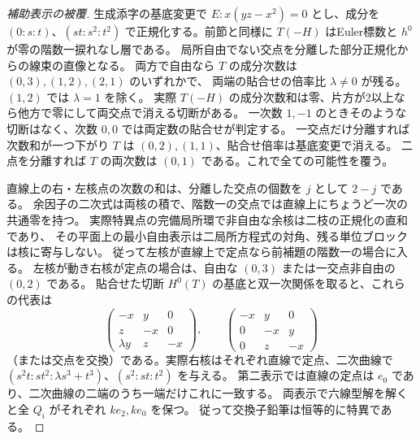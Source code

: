 \begin{proof}[補助表示の被覆]
生成添字の基底変更で $E:x(yz-x^2)=0$ とし、成分を
$(0:s:t)$、$(st:s^2:t^2)$ で正規化する。前節と同様に
$T(-H)$ はEuler標数と $h^0$ が零の階数一捩れなし層である。
局所自由でない交点を分離した部分正規化からの線束の直像となる。
両方で自由なら $T$ の成分次数は $(0,3),(1,2),(2,1)$ のいずれかで、
両端の貼合せの倍率比 $\lambda\ne0$ が残る。$(1,2)$ では $\lambda=1$ を除く。
実際 $T(-H)$ の成分次数和は零、片方が2以上なら他方で零にして両交点で消える切断がある。
一次数 $1,-1$ のときそのような切断はなく、次数 $0,0$ では両定数の貼合せが判定する。
一交点だけ分離すれば次数和が一つ下がり $T$ は $(0,2),(1,1)$、貼合せ倍率は基底変更で消える。
二点を分離すれば $T$ の両次数は $(0,1)$ である。これで全ての可能性を覆う。

直線上の右・左核点の次数の和は、分離した交点の個数を $j$ として $2-j$ である。
余因子の二次式は両核の積で、階数一の交点では直線上にちょうど一次の共通零を持つ。
実際特異点の完備局所環で非自由な余核は二枝の正規化の直和であり、
その平面上の最小自由表示は二局所方程式の対角、残る単位ブロックは核に寄与しない。
従って左核が直線上で定点なら前補題の階数一の場合に入る。
左核が動き右核が定点の場合は、自由な $(0,3)$ または一交点非自由の $(0,2)$ である。
貼合せた切断 $H^0(T)$ の基底と双一次関係を取ると、これらの代表は
\[
 \begin{pmatrix}-x&y&0\\z&-x&0\\\lambda y&z&-x\end{pmatrix},
 \qquad \begin{pmatrix}-x&y&0\\0&-x&y\\0&z&-x\end{pmatrix}
\]
（または交点を交換）である。実際右核はそれぞれ直線で定点、二次曲線で
$(s^2t:st^2:\lambda s^3+t^3)$、$(s^2:st:t^2)$ を与える。
第二表示では直線の定点は $e_0$ であり、二次曲線の二端のうち一端だけこれに一致する。
両表示で六線型解を解くと全 $Q_i$ がそれぞれ $ke_2,ke_0$ を保つ。
従って交換子鉛筆は恒等的に特異である。


\end{proof}
